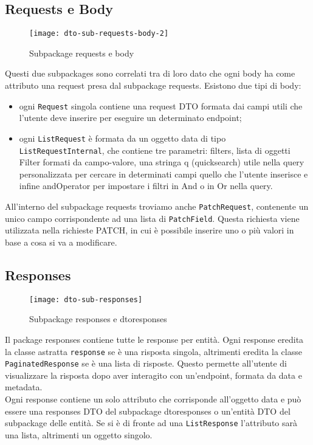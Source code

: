 \subsection{Requests e Body}
\begin{figure}[H] 
    \centering 
    \texttt{[image: dto-sub-requests-body-2]} 
    \caption{Subpackage requests e body}
\end{figure}
Questi due subpackages sono correlati tra di loro dato che ogni body ha come attributo una request presa dal subpackage requests.
Esistono due tipi di body:
\begin{itemize}
\item ogni \texttt{Request} singola contiene una request DTO formata dai campi utili che l'utente deve inserire per eseguire un determinato endpoint;
\item ogni \texttt{ListRequest} è formata da un oggetto data di tipo \texttt{ListRequestInternal}, che contiene tre parametri: filters, lista di oggetti Filter formati da campo-valore, una stringa q (quicksearch) utile nella query personalizzata per cercare in determinati campi quello che l'utente inserisce e infine andOperator per impostare i filtri in And o in Or nella query. 
\end{itemize}
All'interno del subpackage requests troviamo anche \texttt{PatchRequest}, contenente un unico campo corrispondente ad una lista di \texttt{PatchField}. Questa richiesta viene utilizzata nella richieste PATCH, in cui è possibile inserire uno o più valori in base a cosa si va a modificare.

\subsection{Responses}
\begin{figure}[H] 
    \centering 
    \texttt{[image: dto-sub-responses]} 
    \caption{Subpackage responses e dtoresponses}
\end{figure}
Il package responses contiene tutte le response per entità. Ogni response eredita la classe astratta \texttt{response} se è una risposta singola, altrimenti eredita la classe \texttt{PaginatedResponse} se è una lista di risposte. Questo permette all'utente di visualizzare la risposta dopo aver interagito con un'endpoint, formata da data e metadata.\\
Ogni response contiene un solo attributo che corrisponde all'oggetto data e può essere una responses DTO del subpackage dtoresponses o un'entità DTO del subpackage delle entità. Se si è di fronte ad una \texttt{ListResponse} l'attributo sarà una lista, altrimenti un oggetto singolo.